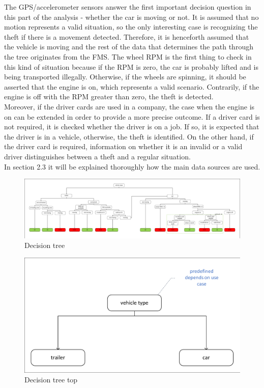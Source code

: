 The GPS/accelerometer sensors answer the first important decision question in this part of the analysis - whether the car is moving or not. It is assumed that no motion represents a valid situation, so the only interesting case is recognizing the theft if there is a movement detected. Therefore, it is henceforth assumed that the vehicle is moving and the rest of the data that determines the path through the tree originates from the FMS. The wheel RPM is the first thing to check in this kind of situation because if the RPM is zero, the car is probably lifted and is being transported illegally. Otherwise, if the wheels are spinning, it should be asserted that the engine is on, which represents a valid scenario. Contrarily, if the engine is off with the RPM greater than zero, the theft is detected.\\
Moreover, if the driver cards are used in a company, the case when the engine is on can be extended in order to provide a more precise outcome. If a driver card is not required, it is checked whether the driver is on a job. If so, it is expected that the driver is in a vehicle, otherwise, the theft is identified. On the other hand, if the driver card is required, information on whether it is an invalid or a valid driver distinguishes between a theft and a regular situation. \\
In section 2.3 it will be explained thoroughly how the main data sources are used.

\begin{figure} [h]
    \includegraphics[clip, trim=0.1cm 0.1cm 0.1cm 0.1cm, width=1\textwidth]{src/pic/DecisionTree}
    \caption{Decision tree}
    \label{DecisionTree}
\end{figure}

\begin{figure} [h]
    \includegraphics[clip, trim=0.1cm 0.1cm 0.1cm 0.1cm, width=1\textwidth]{src/pic/DecisionTreeTop}
    \caption{Decision tree top}
    \label{DecisionTreeTop}
\end{figure}

